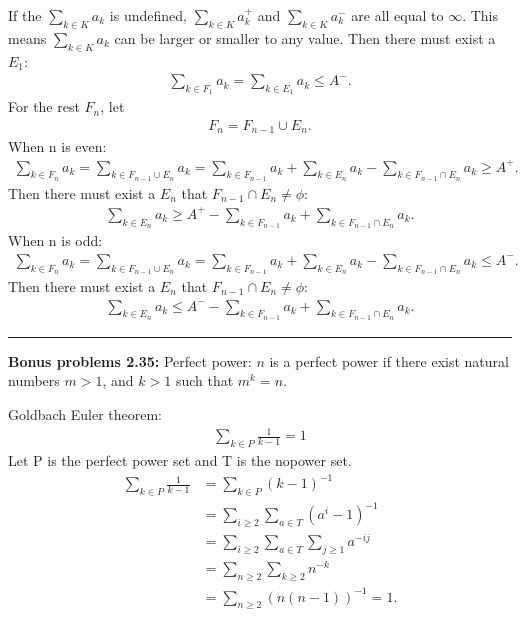 \documentclass{article}
\begin{document}
If the $\sum_{k \in K} a_k$ is undefined, $\sum_{k \in K} a_k^+$ and $\sum_{k \in K} a_k^-$ are all equal to $\infty$.
This means $\sum_{k \in K} a_k$ can be larger or smaller to any value.
Then there must exist a $E_1$:
\begin{align}
\sum_{k \in F_1} a_k = \sum_{k \in E_1} a_k \le A^-.
\end{align}
For the rest $F_n$, let
\begin{align}
F_n = F_{n-1} \cup E_n.
\end{align}
When n is even:
\begin{align}
\sum_{k \in F_n} a_k = \sum_{k \in F_{n-1} \cup E_n} a_k = \sum_{k \in F_{n-1}} a_k + \sum_{k \in E_n} a_k - \sum_{k \in F_{n-1} \cap E_n} a_k \ge A^+.
\end{align}
Then there must exist a $E_n$ that $F_{n-1} \cap E_n \neq \phi$:
\begin{align}
\sum_{k \in E_n} a_k \ge A^+ - \sum_{k \in F_{n-1}} a_k + \sum_{k \in F_{n-1} \cap E_n} a_k.
\end{align}
When n is odd:
\begin{align}
\sum_{k \in F_n} a_k = \sum_{k \in F_{n-1} \cup E_n} a_k = \sum_{k \in F_{n-1}} a_k + \sum_{k \in E_n} a_k - \sum_{k \in F_{n-1} \cap E_n} a_k \le A^-.
\end{align}
Then there must exist a $E_n$ that $F_{n-1} \cap E_n \neq \phi$:
\begin{align}
\sum_{k \in E_n} a_k \le A^- - \sum_{k \in F_{n-1}} a_k + \sum_{k \in F_{n-1} \cap E_n} a_k.
\end{align}

\noindent\rule{\textwidth}{0.4pt}
\textbf{Bonus problems 2.35:}
Perfect power: $n$ is a perfect power if there exist natural numbers $m > 1$, and $k > 1$ such that $m^k = n$.


Goldbach Euler theorem:
\begin{align}
\sum_{k\in P} \frac{1}{k-1} = 1
\end{align}
Let P is the perfect power set and T is the nopower set.
\begin{align}
\sum_{k\in P} \frac{1}{k-1} &= \sum_{k\in P} (k-1)^{-1} \\
			    &= \sum_{i \ge 2} \sum_{a \in T}(a^i-1)^{-1} \\
			    &= \sum_{i \ge 2} \sum_{a \in T} \sum_{j \ge 1} a^{-ij} \\
			    &= \sum_{n \ge 2} \sum_{k \ge 2} n^{-k} \\
			    &= \sum_{n \ge 2} (n(n-1))^{-1} = 1.
\end{align}
\end{document}
